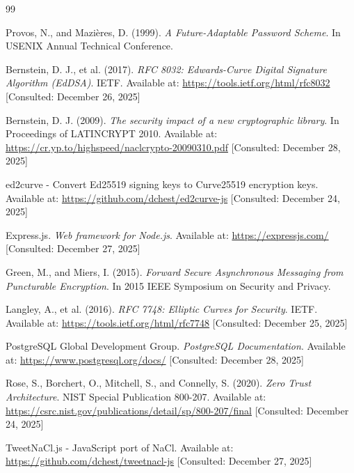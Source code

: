 \documentclass[12pt,a4paper,openany]{book}
\begin{document}
\begin{thebibliography}{99}
\thispagestyle{empty} %

Provos, N., and Mazières, D. (1999). \textit{A Future-Adaptable Password Scheme}. In USENIX Annual Technical Conference.

Bernstein, D. J., et al. (2017). \textit{RFC 8032: Edwards-Curve Digital Signature Algorithm (EdDSA)}. IETF. Available at: \url{https://tools.ietf.org/html/rfc8032} [Consulted: December 26, 2025]

Bernstein, D. J. (2009). \textit{The security impact of a new cryptographic library}. In Proceedings of LATINCRYPT 2010. Available at: \url{https://cr.yp.to/highspeed/naclcrypto-20090310.pdf} [Consulted: December 28, 2025]

ed2curve - Convert Ed25519 signing keys to Curve25519 encryption keys. Available at: \url{https://github.com/dchest/ed2curve-js} [Consulted: December 24, 2025]

Express.js. \textit{Web framework for Node.js}. Available at: \url{https://expressjs.com/} [Consulted: December 27, 2025]

Green, M., and Miers, I. (2015). \textit{Forward Secure Asynchronous Messaging from Puncturable Encryption}. In 2015 IEEE Symposium on Security and Privacy.

Langley, A., et al. (2016). \textit{RFC 7748: Elliptic Curves for Security}. IETF. Available at: \url{https://tools.ietf.org/html/rfc7748} [Consulted: December 25, 2025]

PostgreSQL Global Development Group. \textit{PostgreSQL Documentation}. Available at: \url{https://www.postgresql.org/docs/} [Consulted: December 28, 2025]

Rose, S., Borchert, O., Mitchell, S., and Connelly, S. (2020). \textit{Zero Trust Architecture}. NIST Special Publication 800-207. Available at: \url{https://csrc.nist.gov/publications/detail/sp/800-207/final} [Consulted: December 24, 2025]

TweetNaCl.js - JavaScript port of NaCl. Available at: \url{https://github.com/dchest/tweetnacl-js} [Consulted: December 27, 2025]

\end{thebibliography}
\thispagestyle{empty} %
\end{document}
